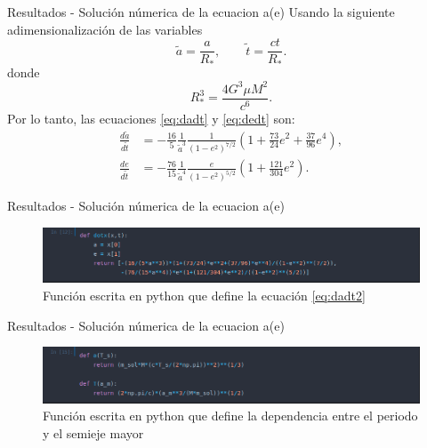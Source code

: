 \begin{frame}{Resultados - Solución númerica de la ecuacion a(e)}
    Usando la siguiente adimensionalización \cite{Vito2008,Gonzalez2018,Gonz2019} de las variables
\begin{equation*}
    \tilde{a}= \frac{a}{R_*}, \qquad  \tilde{t}=\frac{ct}{R_*}.
\end{equation*}
donde
\begin{equation*}
    R_*^3 = \frac{4G^3\mu M^2}{c^6}.
\end{equation*}
Por lo tanto, las ecuaciones \ref{eq:dadt} y \ref{eq:dedt} son:
\begin{align}
    \label{eq:dadt2}
    \frac{d\tilde{a}}{d\tilde{t}} &= -\frac{16}{5}\frac{1}{\tilde{a}^3}\frac{1}{\left(1-e^2\right)^{7/2}}\left(1+\frac{73}{24}e^2+\frac{37}{96}e^4\right) ,\\
    \label{eq:dedt2}
\frac{de}{d\tilde{t}} &= -\frac{76}{15}\frac{1}{\tilde{a}^4}\frac{e}{\left(1-e^2\right)^{5/2}}\left(1+\frac{121}{304}e^2\right) .
\end{align}
\end{frame}
\begin{frame}{Resultados - Solución númerica de la ecuacion a(e)}
    \begin{figure}[H]
        \includegraphics[scale=0.4]{images/dot.png}
        \caption{Función escrita en python que define la ecuación \ref{eq:dadt2} }
    \end{figure}
\end{frame}
\begin{frame}{Resultados - Solución númerica de la ecuacion a(e)}
    \begin{figure}[H]
        \includegraphics[scale=0.4]{images/fun.png}
        \caption{Función escrita en python que define la dependencia entre el periodo y el semieje mayor}
    \end{figure}
\end{frame}
